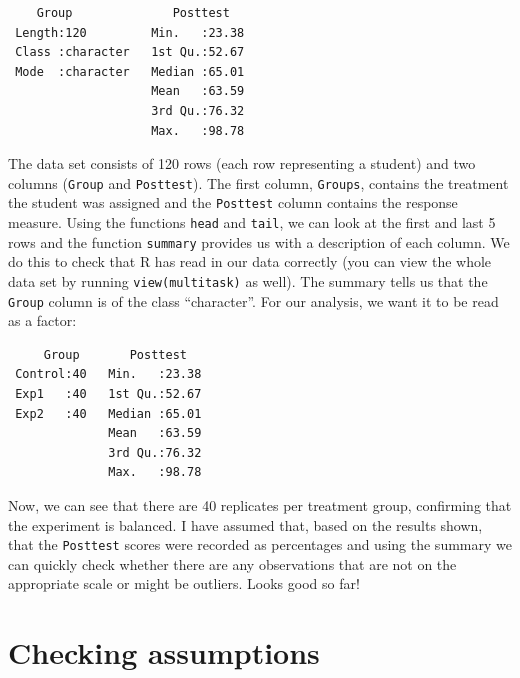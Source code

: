 \documentclass[
  letterpaper,
]{book}
\newenvironment{Shaded}{\begin{snugshade}}{\end{snugshade}}
\newcommand{\FunctionTok}[1]{\textcolor[rgb]{0.28,0.35,0.67}{#1}}
\newcommand{\NormalTok}[1]{\textcolor[rgb]{0.00,0.23,0.31}{#1}}
\newcommand{\OtherTok}[1]{\textcolor[rgb]{0.00,0.23,0.31}{#1}}
\newcommand{\SpecialCharTok}[1]{\textcolor[rgb]{0.37,0.37,0.37}{#1}}
\begin{document}
\begin{verbatim}
    Group              Posttest    
 Length:120         Min.   :23.38  
 Class :character   1st Qu.:52.67  
 Mode  :character   Median :65.01  
                    Mean   :63.59  
                    3rd Qu.:76.32  
                    Max.   :98.78  
\end{verbatim}

The data set consists of 120 rows (each row representing a student) and
two columns (\texttt{Group} and \texttt{Posttest}). The first column,
\texttt{Groups}, contains the treatment the student was assigned and the
\texttt{Posttest} column contains the response measure. Using the
functions \texttt{head} and \texttt{tail}, we can look at the first and
last 5 rows and the function \texttt{summary} provides us with a
description of each column. We do this to check that R has read in our
data correctly (you can view the whole data set by running
\texttt{view(multitask)} as well). The summary tells us that the
\texttt{Group} column is of the class ``character''. For our analysis,
we want it to be read as a factor:

\begin{Shaded}
\end{Shaded}

\begin{verbatim}
     Group       Posttest    
 Control:40   Min.   :23.38  
 Exp1   :40   1st Qu.:52.67  
 Exp2   :40   Median :65.01  
              Mean   :63.59  
              3rd Qu.:76.32  
              Max.   :98.78  
\end{verbatim}

Now, we can see that there are 40 replicates per treatment group,
confirming that the experiment is balanced. I have assumed that, based
on the results shown, that the \texttt{Posttest} scores were recorded as
percentages and using the summary we can quickly check whether there are
any observations that are not on the appropriate scale or might be
outliers. Looks good so far!

\section{Checking assumptions}\label{checking-assumptions}
\end{document}
